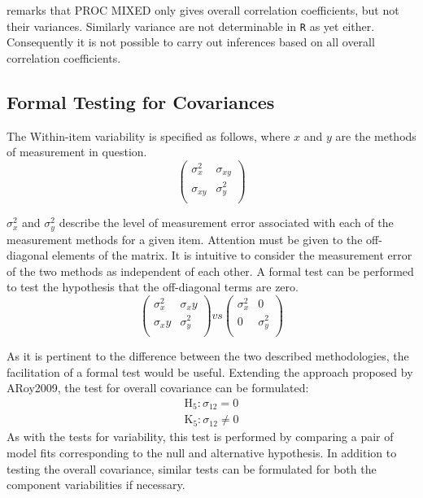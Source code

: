 \documentclass[12pt, a4paper]{report}
\theoremstyle{plain}
\theoremstyle{definition}
\theoremstyle{remark}
\begin{document}
	\citet{ARoy2009} remarks that PROC MIXED only gives overall correlation coefficients, but not their variances. Similarly variance are not determinable in \texttt{R} as yet either. Consequently it is not possible to carry out inferences based on all overall correlation coefficients.
	




	\subsection{Formal Testing for Covariances} %
	
	The Within-item variability is specified as follows, where $x$ and $y$ are the methods of measurement in question.
	\[ \left(
	\begin{array}{cc}
	\sigma^2_x & \sigma_{xy} \\
	\sigma_{xy} & \sigma^2_y \\
	\end{array}
	\right)
	\]
	
	$\sigma^2_x$ and $\sigma^2_y$ describe the level of measurement error associated with each of the measurement methods for a given item. Attention must be given to the off-diagonal elements of the matrix. It is intuitive to consider the measurement error of the two methods as independent of each other. A formal test can be performed to test the hypothesis that the off-diagonal terms are zero.
	\[ \left(
	\begin{array}{cc}
	\sigma^2_x & \sigma_xy \\
	\sigma_xy & \sigma^2_y \\
	\end{array}
	\right) vs \left(
	\begin{array}{cc}
	\sigma^2_x & 0 \\
	0 & \sigma^2_y \\
	\end{array}
	\right)
	\]
	
	As it is pertinent to the difference between the two described methodologies, the facilitation of a formal test would be useful. Extending the approach proposed by ARoy2009, the test for overall covariance can be formulated:
	\begin{eqnarray*}
		\operatorname{H_5} : \sigma_{12} = 0 \\
		\operatorname{K_5} : \sigma_{12} \neq 0
	\end{eqnarray*}
	As with the tests for variability, this test is performed by comparing a pair of model fits corresponding to the null and alternative hypothesis. In addition to testing the overall covariance, similar tests can be formulated for both the component variabilities if necessary.
	
\end{document}
